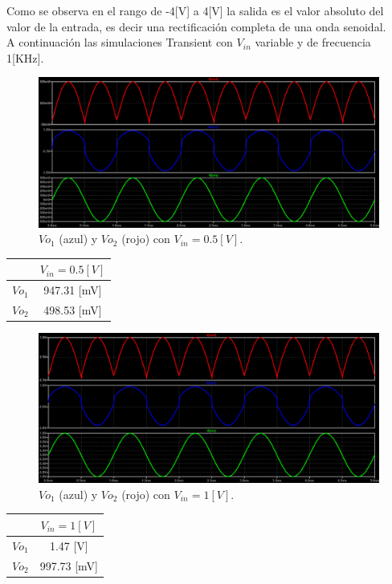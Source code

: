 Como se observa  en el rango de -4[V] a 4[V] la salida es el valor absoluto del valor de la entrada, es decir una rectificación completa de una onda senoidal.\\
A continuación las simulaciones Transient con $V_{in}$ variable y de frecuencia 1[KHz].

\begin{figure}[H]
	\centering
	\includegraphics[width=1\textwidth]{figuras/Vo1_Vo2_Vin=0.5.png}
	\caption{$Vo_1$ (azul) y $Vo_2$ (rojo) con $V_{in}=0.5[V]$.}
\end{figure}
\begin{center}
	\begin{tabular}{| c | c |}
		\hline
				& $V_{in}= 0.5[V]$ \\ \hline
		$Vo_1$ 	&  	947.31 [mV]	 \\
		$Vo_2$ 	& 	498.53 [mV]	 \\ \hline
	\end{tabular}
\end{center}
\begin{figure}[H]
	\centering
	\includegraphics[width=1\textwidth]{figuras/Vo1_Vo2_Vin=1.png}
	\caption{$Vo_1$ (azul) y $Vo_2$ (rojo) con $V_{in}=1[V]$.}
\end{figure}
\begin{center}
	\begin{tabular}{| c | c |}
		\hline
		& $V_{in}= 1[V]$ \\ \hline
		$Vo_1$ 	&  	  1.47 [V]	 \\
		$Vo_2$ 	& 	997.73 [mV]	 \\ \hline
	\end{tabular}
\end{center}
